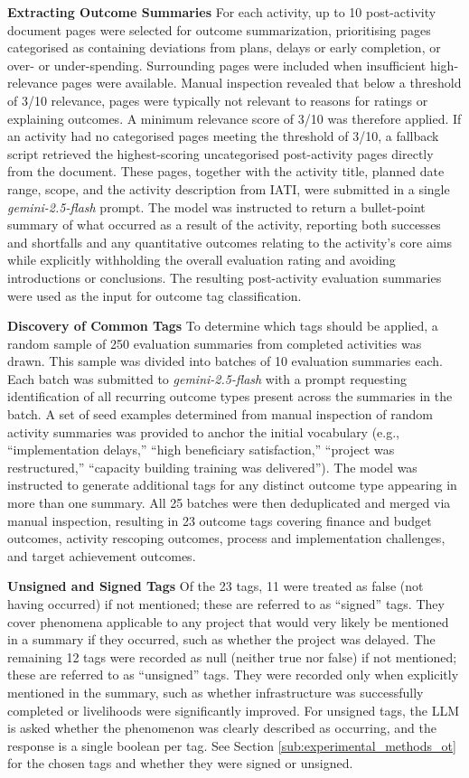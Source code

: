 \documentclass[12pt,a4paper]{article}
\begin{document}
\textbf{Extracting Outcome Summaries}
For each activity, up to 10 post-activity document pages were selected for outcome summarization, prioritising pages categorised as containing deviations from plans, delays or early completion, or over- or under-spending. Surrounding pages were included when insufficient high-relevance pages were available. Manual inspection revealed that below a threshold of 3/10 relevance, pages were typically not relevant to reasons for ratings or explaining outcomes. A minimum relevance score of 3/10 was therefore applied. If an activity had no categorised pages meeting the threshold of 3/10, a fallback script retrieved the highest-scoring uncategorised post-activity pages directly from the document. These pages, together with the activity title, planned date range, scope, and the activity description from IATI, were submitted in a single \emph{gemini-2.5-flash} prompt. The model was instructed to return a bullet-point summary of what occurred as a result of the activity, reporting both successes and shortfalls and any quantitative outcomes relating to the activity's core aims while explicitly withholding the overall evaluation rating and avoiding introductions or conclusions. The resulting post-activity evaluation summaries were used as the input for outcome tag classification. 

\textbf{Discovery of Common Tags}
To determine which tags should be applied, a random sample of 250 evaluation summaries from completed activities was drawn. This sample was divided into batches of 10 evaluation summaries each. Each batch was submitted to \emph{gemini-2.5-flash} with a prompt requesting identification of all recurring outcome types present across the summaries in the batch. A set of seed examples determined from manual inspection of random activity summaries was provided to anchor the initial vocabulary (e.g., ``implementation delays,'' ``high beneficiary satisfaction,'' ``project was restructured,'' ``capacity building training was delivered''). The model was instructed to generate additional tags for any distinct outcome type appearing in more than one summary. All 25 batches were then deduplicated and merged via manual inspection, resulting in 23 outcome tags covering finance and budget outcomes, activity rescoping outcomes, process and implementation challenges, and target achievement outcomes.

\textbf{Unsigned and Signed Tags}
Of the 23 tags, 11 were treated as false (not having occurred) if not mentioned; these are referred to as ``signed'' tags. They cover phenomena applicable to any project that would very likely be mentioned in a summary if they occurred, such as whether the project was delayed. The remaining 12 tags were recorded as null (neither true nor false) if not mentioned; these are referred to as ``unsigned'' tags. They were recorded only when explicitly mentioned in the summary, such as whether infrastructure was successfully completed or livelihoods were significantly improved. For unsigned tags, the LLM is asked whether the phenomenon was clearly described as occurring, and the response is a single boolean per tag. See Section \ref{sub:experimental_methods_ot} for the chosen tags and whether they were signed or unsigned.
\end{document}
